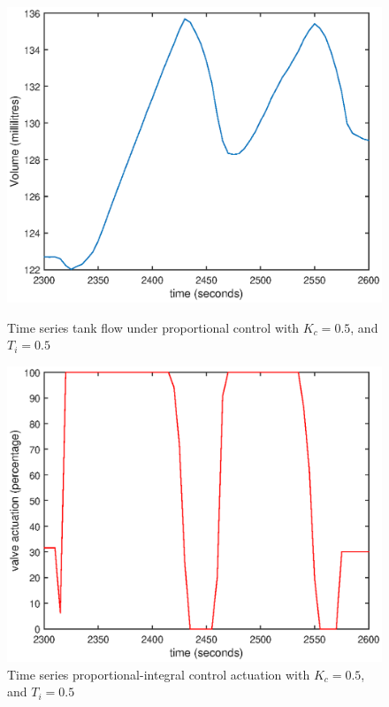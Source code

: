 \documentclass{article}
\begin{document}
\begin{figure}[h]
	\centering
	\begin{minipage}{0.45\textwidth}
		\centering
		\includegraphics[scale=0.4]{PI_Kc_05_Ti_05}
		\caption{Time series tank flow under proportional control with $K_c = 0.5$, and $T_i = 0.5$}
	\end{minipage}
	\hspace{0.5cm}
	\begin{minipage}{0.45\textwidth}
		\centering
		\includegraphics[scale=0.4]{PI_Kc_05_Ti_05_control}
		\caption{Time series proportional-integral control actuation with $K_c = 0.5$, and $T_i = 0.5$}
	\end{minipage}
\end{figure}
\end{document}
